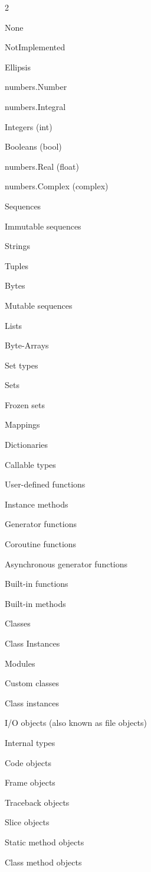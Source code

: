 \documentclass [8pt] {extarticle}
\begin{document}
    \begin {multicols} {2}

    None

    NotImplemented

    Ellipsis

    numbers.Number

    \quad numbers.Integral

    \qquad Integers (int)

    \qquad Booleans (bool)

    \quad numbers.Real (float)

    \quad numbers.Complex (complex)

    Sequences

    \quad Immutable sequences

    \qquad Strings

    \qquad Tuples

    \qquad Bytes

    \quad Mutable sequences

    \qquad Lists

    \qquad Byte-Arrays

    Set types

    \quad Sets

    \quad Frozen sets

    Mappings

    \quad Dictionaries

    \columnbreak

    Callable types

    \quad User-defined functions

    \quad Instance methods

    \quad Generator functions

    \quad Coroutine functions

    \quad Asynchronous generator functions

    \quad Built-in functions

    \quad Built-in methods

    \quad Classes

    \quad Class Instances

    Modules

    Custom classes

    Class instances

    I/O objects (also known as file objects)

    Internal types

    \quad Code objects

    \quad Frame objects

    \quad Traceback objects

    \quad Slice objects

    \quad Static method objects

    \quad Class method objects

    \end {multicols}
\end{document}
